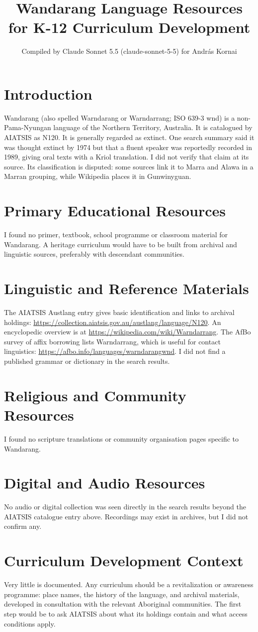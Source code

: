 \documentclass[12pt]{article}
\title{Wandarang Language Resources for K-12 Curriculum Development}
\author{Compiled by Claude Sonnet 5.5 (claude-sonnet-5-5) for Andr\'as Kornai}
\date{}
\begin{document}
\maketitle

\section{Introduction}
Wandarang (also spelled Warndarang or Warndarrang; ISO 639-3 wnd) is a non-Pama-Nyungan language of the Northern Territory, Australia. It is catalogued by AIATSIS as N120. It is generally regarded as extinct. One search summary said it was thought extinct by 1974 but that a fluent speaker was reportedly recorded in 1989, giving oral texts with a Kriol translation. I did not verify that claim at its source. Its classification is disputed: some sources link it to Marra and Alawa in a Marran grouping, while Wikipedia places it in Gunwinyguan.

\section{Primary Educational Resources}
I found no primer, textbook, school programme or classroom material for Wandarang. A heritage curriculum would have to be built from archival and linguistic sources, preferably with descendant communities.

\section{Linguistic and Reference Materials}
The AIATSIS Austlang entry gives basic identification and links to archival holdings: \url{https://collection.aiatsis.gov.au/austlang/language/N120}. An encyclopedic overview is at \url{https://wikipedia.com/wiki/Warndarrang}. The AfBo survey of affix borrowing lists Warndarrang, which is useful for contact linguistics: \url{https://afbo.info/languages/warndarangwnd}. I did not find a published grammar or dictionary in the search results.

\section{Religious and Community Resources}
I found no scripture translations or community organisation pages specific to Wandarang.

\section{Digital and Audio Resources}
No audio or digital collection was seen directly in the search results beyond the AIATSIS catalogue entry above. Recordings may exist in archives, but I did not confirm any.

\section{Curriculum Development Context}
Very little is documented. Any curriculum should be a revitalization or awareness programme: place names, the history of the language, and archival materials, developed in consultation with the relevant Aboriginal communities. The first step would be to ask AIATSIS about what its holdings contain and what access conditions apply.
\end{document}
